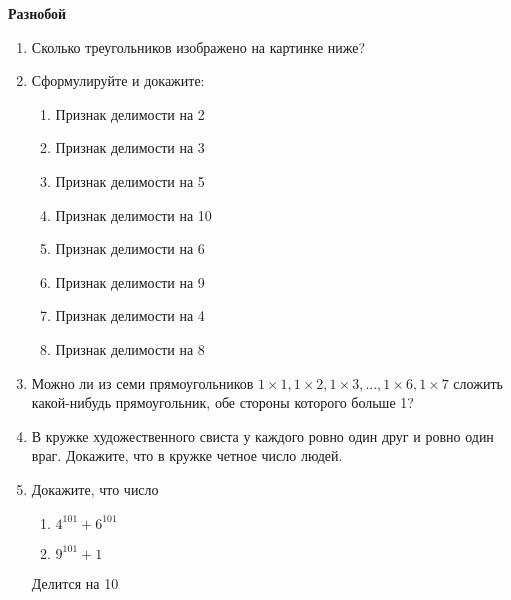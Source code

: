 \documentclass{article}
\begin{document}
\large
	
\begin{center}
	\textbf{Разнобой}
\end{center}


\begin{enumerate}[label*=\protect\fbox{\arabic{enumi}}]
	
\item Сколько треугольников изображено на картинке ниже?

\item Сформулируйте и докажите:

\begin{enumerate}
	\item Признак делимости на 2
	
	\item Признак делимости на 3
	
	\item Признак делимости на 5
	
	\item Признак делимости на 10
	
	\item Признак делимости на 6
	
	\item Признак делимости на 9
	
	\item Признак делимости на 4
	
	\item Признак делимости на 8
\end{enumerate}


\item Можно ли из семи прямоугольников $1 \times1, 1 \times2, 1 \times3, ..., 1 \times6, 1 \times7$ сложить какой-нибудь прямоугольник, обе стороны которого больше 1?

\item В кружке художественного свиста у каждого ровно один друг и ровно один враг. Докажите, что в кружке четное число людей.

\item Докажите, что число 

\begin{enumerate}
	\item $4^{101} + 6^{101}$
	
	\item $9^{101} + 1$ 
\end{enumerate}

Делится на 10


\end{enumerate}
\end{document}
